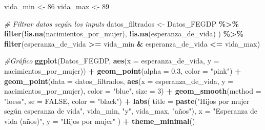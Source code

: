 \documentclass[
]{article}
\newenvironment{Shaded}{\begin{snugshade}}{\end{snugshade}}
\newcommand{\AttributeTok}[1]{\textcolor[rgb]{0.13,0.29,0.53}{#1}}
\newcommand{\CommentTok}[1]{\textcolor[rgb]{0.56,0.35,0.01}{\textit{#1}}}
\newcommand{\ConstantTok}[1]{\textcolor[rgb]{0.56,0.35,0.01}{#1}}
\newcommand{\DecValTok}[1]{\textcolor[rgb]{0.00,0.00,0.81}{#1}}
\newcommand{\FloatTok}[1]{\textcolor[rgb]{0.00,0.00,0.81}{#1}}
\newcommand{\FunctionTok}[1]{\textcolor[rgb]{0.13,0.29,0.53}{\textbf{#1}}}
\newcommand{\NormalTok}[1]{#1}
\newcommand{\OtherTok}[1]{\textcolor[rgb]{0.56,0.35,0.01}{#1}}
\newcommand{\SpecialCharTok}[1]{\textcolor[rgb]{0.81,0.36,0.00}{\textbf{#1}}}
\newcommand{\StringTok}[1]{\textcolor[rgb]{0.31,0.60,0.02}{#1}}
\begin{document}
\begin{Shaded}
\begin{Highlighting}[]
\NormalTok{vida\_min }\OtherTok{\textless{}{-}} \DecValTok{86}
\NormalTok{vida\_max }\OtherTok{\textless{}{-}} \DecValTok{89}
  
  \CommentTok{\# Filtrar datos según los inputs}
\NormalTok{  datos\_filtrados }\OtherTok{\textless{}{-}}\NormalTok{ Datos\_FEGDP }\SpecialCharTok{\%\textgreater{}\%}
    \FunctionTok{filter}\NormalTok{(}\SpecialCharTok{!}\FunctionTok{is.na}\NormalTok{(nacimientos\_por\_mujer),}
      \SpecialCharTok{!}\FunctionTok{is.na}\NormalTok{(esperanza\_de\_vida)}
\NormalTok{    ) }\SpecialCharTok{\%\textgreater{}\%}
    \FunctionTok{filter}\NormalTok{(esperanza\_de\_vida }\SpecialCharTok{\textgreater{}=}\NormalTok{ vida\_min }\SpecialCharTok{\&}\NormalTok{ esperanza\_de\_vida }\SpecialCharTok{\textless{}=}\NormalTok{ vida\_max)}

\CommentTok{\#Gráfico}
 \FunctionTok{ggplot}\NormalTok{(Datos\_FEGDP, }\FunctionTok{aes}\NormalTok{(}\AttributeTok{x =}\NormalTok{ esperanza\_de\_vida, }\AttributeTok{y =}\NormalTok{ nacimientos\_por\_mujer)) }\SpecialCharTok{+}
    \FunctionTok{geom\_point}\NormalTok{(}\AttributeTok{alpha =} \FloatTok{0.3}\NormalTok{, }\AttributeTok{color =} \StringTok{"pink"}\NormalTok{) }\SpecialCharTok{+}
    \FunctionTok{geom\_point}\NormalTok{(}\AttributeTok{data =}\NormalTok{ datos\_filtrados, }\FunctionTok{aes}\NormalTok{(}\AttributeTok{x =}\NormalTok{ esperanza\_de\_vida, }\AttributeTok{y =}\NormalTok{ nacimientos\_por\_mujer), }
               \AttributeTok{color =} \StringTok{"blue"}\NormalTok{, }\AttributeTok{size =} \DecValTok{3}\NormalTok{) }\SpecialCharTok{+}
    \FunctionTok{geom\_smooth}\NormalTok{(}\AttributeTok{method =} \StringTok{"loess"}\NormalTok{, }\AttributeTok{se =} \ConstantTok{FALSE}\NormalTok{, }\AttributeTok{color =} \StringTok{"black"}\NormalTok{) }\SpecialCharTok{+}
    \FunctionTok{labs}\NormalTok{(}
      \AttributeTok{title =} \FunctionTok{paste}\NormalTok{(}\StringTok{"Hijos por mujer según esperanza de vida"}\NormalTok{,}
\NormalTok{                    vida\_min, }\StringTok{"y"}\NormalTok{, vida\_max, }\StringTok{"años"}\NormalTok{),}
      \AttributeTok{x =} \StringTok{"Esperanza de vida (años)"}\NormalTok{,}
      \AttributeTok{y =} \StringTok{"Hijos por mujer"}
\NormalTok{    ) }\SpecialCharTok{+}
    \FunctionTok{theme\_minimal}\NormalTok{()}
\end{Highlighting}
\end{Shaded}
\end{document}
